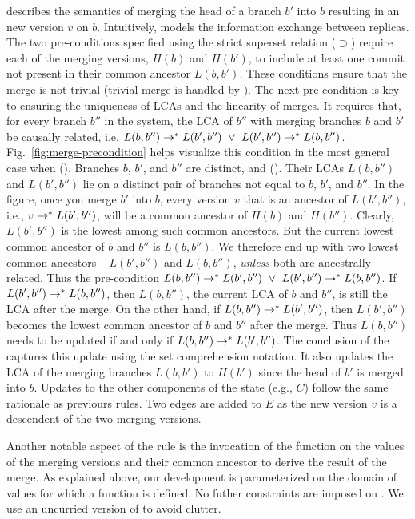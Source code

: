  describes the semantics of merging the head of a
branch $b'$ into $b$ resulting in an new version $v$ on $b$.
Intuitively,  models the information exchange between
replicas. The two pre-conditions specified using the strict superset
relation ($\supset$) require each of the merging versions, $H(b)$ and
$H(b')$, to include at least one commit not present in their common
ancestor $L(b,b')$. These conditions ensure that the merge is not
trivial (trivial merge is handled by ). The next
pre-condition is key to ensuring the uniqueness of LCAs and the
linearity of merges. It requires that, for every branch $b''$ in the
system, the LCA of $b''$ with merging branches $b$ and $b'$ be
causally related, i.e, $L(b,b'') \rightarrow^{*} L(b',b'') ~\vee~ L(b',b'')
\rightarrow^{*} L(b,b'')$. Fig.~\ref{fig:merge-precondition} helps visualize
this condition in the most general case when (). Branches $b$,
$b'$, and $b''$ are distinct, and (). Their LCAs $L(b,b'')$ and
$L(b',b'')$ lie on a distinct pair of branches not equal to $b$, $b'$,
and $b''$. In the figure, once you merge $b'$ into $b$, every version
$v$ that is an ancestor of $L(b',b'')$, i.e., $v \rightarrow^{*} L(b',b'')$,
will be  a common ancestor of $H(b)$ and $H(b'')$. Clearly,
$L(b',b'')$ is the lowest among such common ancestors. But the current
lowest common ancestor of $b$ and $b''$ is $L(b,b'')$. We therefore
end up with two lowest common ancestors -- $L(b',b'')$ and $L(b,b'')$,
\emph{unless} both are ancestrally related. Thus the pre-condition
$L(b,b'') \rightarrow^{*} L(b',b'') ~\vee~ L(b',b'') \rightarrow^{*} L(b,b'')$. If
$L(b',b'') \rightarrow^{*} L(b,b'')$, then $L(b,b'')$, the current LCA of $b$
and $b''$, is still the LCA after the merge. On the other hand, if
$L(b,b'') \rightarrow^{*} L(b',b'')$, then $L(b',b'')$ becomes the lowest
common ancestor of $b$ and $b''$ after the merge. Thus $L(b,b'')$
needs to be updated if and only if $L(b,b'') \rightarrow^{*} L(b',b'')$. The
conclusion of the  captures this update using the set
comprehension notation. It also updates the LCA of the merging
branches $L(b,b')$ to $H(b')$ since the head of $b'$ is merged into
$b$. Updates to the other components of the state (e.g., $C$) follow
the same rationale as previours rules. Two edges are added to $E$ as
the new version $v$ is a descendent of the two merging versions.

Another notable aspect of the  rule is the invocation
of the  function on the values of the  merging versions and
their common ancestor to derive the result of the merge. As explained
above, our development is parameterized on the domain of values for
which a  function is defined. No futher constraints are
imposed on . We use an uncurried version of  to
avoid clutter.

